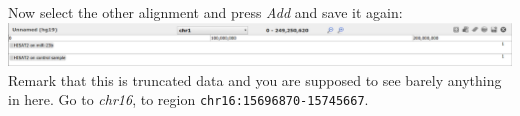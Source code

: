 \documentclass[11pt,a4paper]{article}
\begin{document}
Now select the other alignment and press \textit{Add} and save it again:\\
\includegraphics[width=\textwidth]{figures/alignment_07.png}\\
Remark that this is truncated data and you are supposed to see barely anything in here. Go to \textit{chr16}, to region \verb|chr16:15696870-15745667|.




%
%


\vspace{-1.5em}

\end{document}
